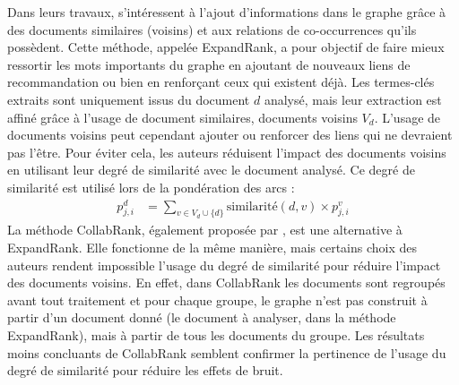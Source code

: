         Dans leurs travaux, \citet{wan2008expandrank} s'intéressent à l'ajout
        d'informations dans le graphe grâce à des documents similaires (voisins)
        et aux relations de co-occurrences qu'ils possèdent. Cette méthode,
        appelée ExpandRank, a pour objectif de faire mieux ressortir les mots
        importants du graphe en ajoutant de nouveaux liens de recommandation ou
        bien en renforçant ceux qui existent déjà. Les termes-clés extraits sont
        uniquement issus du document $d$ analysé, mais leur extraction est affiné
        grâce à l'usage de document similaires, documents voisins $V_d$.
        L'usage de documents voisins peut cependant ajouter ou renforcer des liens
        qui ne devraient pas l'être. Pour éviter cela, les auteurs réduisent
        l'impact des documents voisins en utilisant leur degré de similarité avec
        le document analysé. Ce degré de similarité est utilisé lors de la
        pondération des arcs :
        \begin{align}
          p_{j, i}^d &= \sum_{v \in V_d \cup \{d\}} \text{similarité}(d, v) \times p_{j, i}^v
        \end{align}
        La méthode CollabRank, également proposée par \citet{wan2008collabrank},
        est une alternative à ExpandRank. Elle fonctionne de la même manière, mais
        certains choix des auteurs rendent impossible l'usage du degré de
        similarité pour réduire l'impact des documents voisins. En effet, dans
        CollabRank les documents sont regroupés avant tout traitement et pour
        chaque groupe, le graphe n'est pas construit à partir d'un document donné
        (le document à analyser, dans la méthode ExpandRank), mais à partir de
        tous les documents du groupe. Les résultats moins concluants de CollabRank
        semblent confirmer la pertinence de l'usage du degré de similarité pour
        réduire les effets de bruit.

